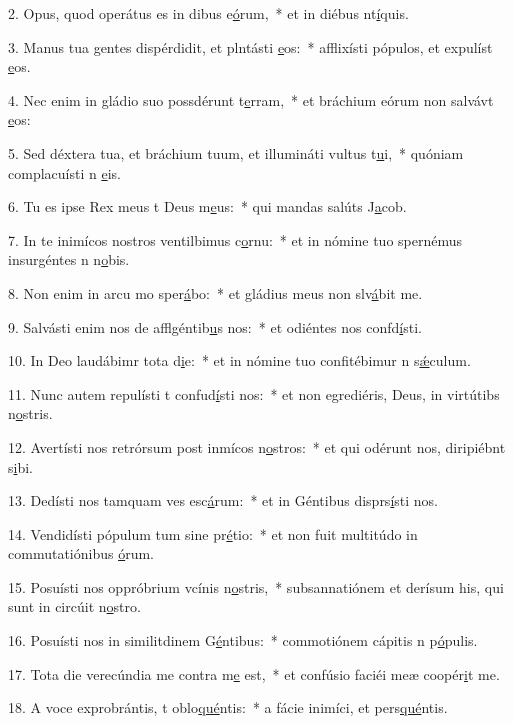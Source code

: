 2. Opus, quod operátus es in dibus e\uline{ó}rum,~* et in diébus nt\uline{í}quis.\par 
3. Manus tua gentes dispérdidit, et plntásti \uline{e}os:~* afflixísti pópulos, et expulíst \uline{e}os.\par 
4. Nec enim in gládio suo possdérunt t\uline{e}rram,~* et bráchium eórum non salvávt \uline{e}os:\par 
5. Sed déxtera tua, et bráchium tuum, et illumináti vultus t\uline{u}i,~* quóniam complacuísti n \uline{e}is.\par 
6. Tu es ipse Rex meus t Deus m\uline{e}us:~* qui mandas salúts J\uline{a}cob.\par 
7. In te inimícos nostros ventilbimus c\uline{o}rnu:~* et in nómine tuo spernémus insurgéntes n n\uline{o}bis.\par 
8. Non enim in arcu mo sper\uline{á}bo:~* et gládius meus non slv\uline{á}bit me.\par 
9. Salvásti enim nos de afflgéntib\uline{u}s nos:~* et odiéntes nos confd\uline{í}sti.\par 
10. In Deo laudábimr tota d\uline{i}e:~* et in nómine tuo confitébimur n s\uline{ǽ}culum.\par 
11. Nunc autem repulísti t confud\uline{í}sti nos:~* et non egrediéris, Deus, in virtútibs n\uline{o}stris.\par 
12. Avertísti nos retrórsum post inmícos n\uline{o}stros:~* et qui odérunt nos, diripiébnt s\uline{i}bi.\par 
13. Dedísti nos tamquam ves esc\uline{á}rum:~* et in Géntibus disprs\uline{í}sti nos.\par 
14. Vendidísti pópulum tum sine pr\uline{é}tio:~* et non fuit multitúdo in commutatiónibus \uline{ó}rum.\par 
15. Posuísti nos oppróbrium vcínis n\uline{o}stris,~* subsannatiónem et derísum his, qui sunt in circúit n\uline{o}stro.\par 
16. Posuísti nos in similitdinem G\uline{é}ntibus:~* commotiónem cápitis n p\uline{ó}pulis.\par 
17. Tota die verecúndia me contra m\uline{e} est,~* et confúsio faciéi meæ coopér\uline{i}t me.\par 
18. A voce exprobrántis, t oblo\uline{qué}ntis:~* a fácie inimíci, et pers\uline{qué}ntis.\par 
